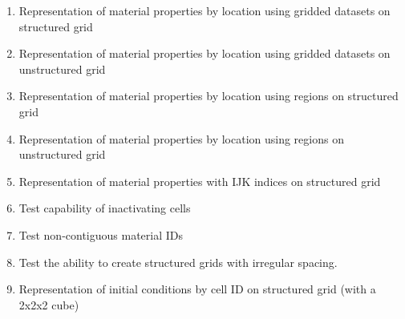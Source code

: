 \begin{enumerate}[label=Test \alph*.,ref=Test \alph*,nosep]
	\item \label{testRepMatGridStruc} Representation of material properties by location using gridded datasets on structured grid
	\item \label{testRepMatGridUnstruc} Representation of material properties by location using gridded datasets on unstructured grid
	\item \label{testRepMatRegStruc} Representation of material properties by location using regions on structured grid
	\item \label{testRepMatRegUnstruc} Representation of material properties by location using regions on unstructured grid
	\item \label{testRepMatIJKStruc} Representation of material properties with IJK indices on structured grid
	\item \label{testInactive} Test capability of inactivating cells
	\item \label{testNonContMaterialIDS} Test non-contiguous material IDs
	\item \label{testStructIrregGrid} Test the ability to create structured grids with irregular spacing.
	\item \label{testRepICCellIDStruc} Representation of initial conditions by cell ID on structured grid (with a 2x2x2 cube)
\end{enumerate}

